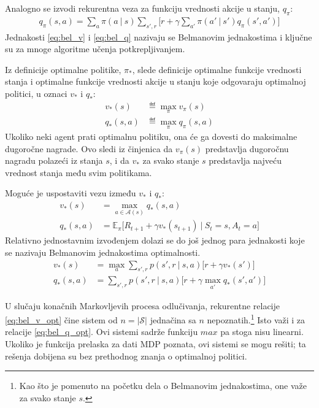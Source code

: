 Analogno se izvodi rekurentna veza za funkciju vrednosti akcije u stanju, $q_{\pi}$:
\begin{equation}
	\label{eq:bel_q}
	\begin{aligned}
		q_{\pi}(s,a) = \sum_{a}^{} \pi(a~|~s)\sum_{s', r}^{}\big[ r+\gamma\sum_{a'}^{}\pi(a'~|~s') q_{\pi}(s', a') \big]
	\end{aligned}
\end{equation}
Jednakosti \eqref{eq:bel_v} i \eqref{eq:bel_q} nazivaju se Belmanovim jednakostima i ključne su za mnoge algoritme učenja potkrepljivanjem. 
\par 
Iz definicije optimalne politike, $\pi_*$, slede definicije optimalne funkcije vrednosti stanja i optimalne funkcije vrednosti akcije u stanju koje odgovaraju optimalnoj politici, u oznaci $v_*$ i $q_*$:
\begin{equation}
	\begin{aligned}
		v_*(s) &\eqdef \max_{\pi} v_{\pi} (s)	 \\
		q_*(s,a) &\eqdef \max_{\pi} q_{\pi}(s,a)
	\end{aligned}
\end{equation}
Ukoliko neki agent prati optimalnu politiku, ona će ga dovesti do maksimalne dugoročne nagrade. Ovo sledi iz činjenica da $v_{\pi}(s)$ predstavlja dugoročnu nagradu polazeći iz stanja $s$, i da $v_*$ za svako stanje $s$ predstavlja najveću vrednost stanja među svim politikama.
\par
Moguće je uspostaviti vezu između $v_*$ i $q_*$:
\begin{equation}
	\begin{aligned}
		v_*(s) &= \max_{a \in \mathcal{A}(s)} q_* (s,a)	 \\
		q_*(s,a) &= \mathbb{E}_{\pi}\big[R_{t+1} + \gamma v_*(s_{t+1})~|~S_t=s, A_t=a\big]
	\end{aligned}
\end{equation}
Relativno jednostavnim izvođenjem dolazi se do još jednog para jednakosti koje se nazivaju Belmanovim jednakostima optimalnosti.
	\begin{align}
		\label{eq:bel_v_opt} v_*(s) &= \max_{a}\sum_{s', r}^{} p(s', r~|~s,a)\big[r+\gamma v_*(s')\big]	 \\
		\label{eq:bel_q_opt} q_*(s,a) &= \sum_{s', r}^{} p(s', r~|~s,a)\big[r + \gamma \max_{a'}q_*(s',a')\big]
	\end{align}
\par 
U slučaju konačnih Markovljevih procesa odlučivanja, rekurentne relacije \eqref{eq:bel_v_opt} čine sistem od $n=|\mathcal{S}|$ jednačina sa $n$ nepoznatih.\footnote{Kao što je pomenuto na početku dela o Belmanovim jednakostima, one važe za svako stanje $s$.} Isto važi i za relacije \eqref{eq:bel_q_opt}. Ovi sistemi sadrže funkciju $max$ pa stoga nisu linearni. Ukoliko je funkcija prelaska za dati MDP poznata, ovi sistemi se mogu rešiti; ta rešenja dobijena su bez prethodnog znanja o optimalnoj politici. 
